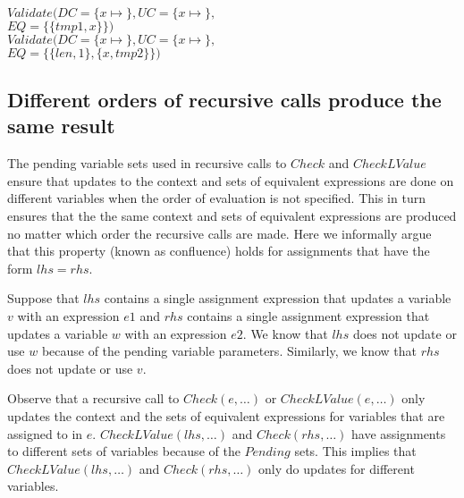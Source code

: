 \begin{small}
\begin{tabbing}
\>\\
\>\>$Validate(DC = \{x \mapsto$$\},
                   \mathit{UC} = \{x\mapsto $$\},$\\
\>\>\>\>\>\>$EQ = \{\{tmp1, x\}\})$\\
\>\>$Validate(DC = \{x \mapsto$$\}, 
                   \mathit{UC} = \{x\mapsto $$\},$\\
\>\>\>\>\>\>$EQ = \{\{len, 1\}, \{x, tmp2\}\})$\\
\end{tabbing}
\end{small}

\subsection{Different orders of recursive calls produce the same result}

The pending variable sets used in recursive calls to $Check$ and $CheckLValue$
ensure that updates to the context and sets of equivalent expressions are done on different variables when
the order of evaluation is not specified.  This in turn ensures that the the same context and sets of equivalent expressions
are produced no matter which order the recursive calls are made.   Here we informally argue 
that this property (known as confluence) holds for assignments that have  the form $lhs = rhs$.

Suppose that $lhs$
contains a single assignment expression that updates a variable $v$ with an expression $e1$ and 
$rhs$ contains a single assignment expression that updates  a variable $w$ with an expression $e2$.  
We know that $lhs$ does not update or use $w$ because of the pending variable parameters.  Similarly, 
we know that $rhs$ does not update or use $v$.

Observe that a recursive call to $Check(e, \ldots)$ or $CheckLValue(e, \ldots)$ only updates the context
and the sets of equivalent expressions for variables that are assigned to in $e$.   $CheckLValue(lhs,\ldots)$ and
$Check(rhs, \ldots)$ have assignments to different sets of variables because of the $Pending$ sets.  This
implies that $CheckLValue(lhs,\ldots)$ and $Check(rhs, \ldots)$ only do updates for different variables.

